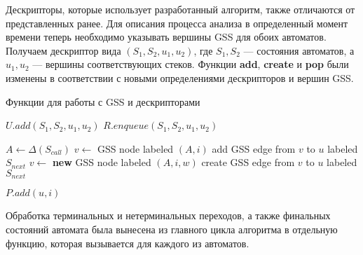 Дескрипторы, которые использует разработанный алгоритм, также отличаются от представленных ранее. Для описания процесса анализа в определенный момент времени теперь необходимо указывать вершины GSS для обоих автоматов. Получаем дескриптор вида $(S_1, S_2, u_1, u_2)$, где $S_1, S_2$ --- состояния автоматов, а $u_1, u_2$ --- вершины соответствующих стеков. Функции \textbf{add}, \textbf{create} и \textbf{pop} были изменены в соответствии с новыми определениями дескрипторов и вершин GSS.
\begin{algorithm}[H]
\begin{algorithmic}
\caption{Функции для работы с GSS и дескрипторами}
		\State $U.add(S_1, S_2, u_1, u_2)$
		\State $R.enqueue(S_1, S_2, u_1, u_2)$
	\EndIf
\EndFunction

	\State $A \gets \Delta(S_{call})$
		\State $v \gets$ GSS node labeled $(A, i)$
			\State add GSS edge from $v$ to $u$ labeled $S_{next}$
					\State {}
				\EndIf
				\State {}
			\EndFor
		\EndIf
	\Else
		\State $v \gets$ \textbf{new} GSS node labeled $(A, i, w)$
		\State create GSS edge from $v$ to $u$ labeled $S_{next}$
		\State {}
	\EndIf
\EndFunction
  
		\State $P.add(u,i)$
				\State {}
			\EndIf
			\State {}
		\EndFor
	\EndIf
\EndFunction
\end{algorithmic}
\end{algorithm}

Обработка терминальных и нетерминальных переходов, а также финальных состояний автомата была вынесена из главного цикла алгоритма в отдельную функцию, которая вызывается для каждого из автоматов.

